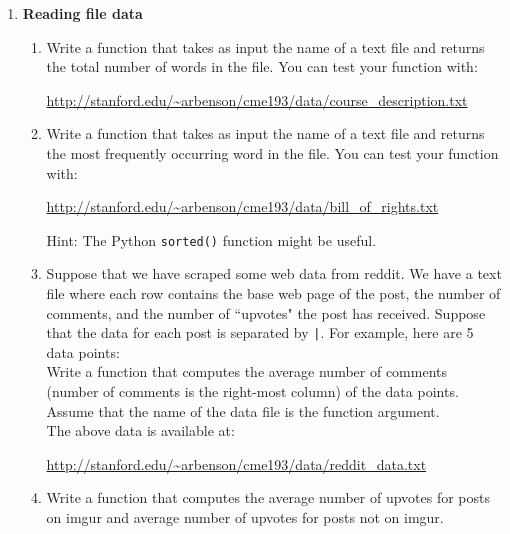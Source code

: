 \documentclass{article}
\newcounter{points}
\begin{document}
\pagestyle{fancy}
\begin{enumerate}

\item \textbf{Reading file data}
\begin{enumerate}
\item Write a function that takes as input the name of a text file and returns the total number of words in the file.  You can test your function with:
\begin{center}
\url{http://stanford.edu/~arbenson/cme193/data/course_description.txt}
\end{center}
\end{enumerate}

\begin{enumerate}
\setcounter{enumii}{1}
\item Write a function that takes as input the name of a text file and returns the most frequently occurring word in the file.  You can test your function with:
\begin{center}
\url{http://stanford.edu/~arbenson/cme193/data/bill_of_rights.txt}
\end{center}
Hint: The Python \texttt{sorted()} function might be useful. \\
\end{enumerate}

\begin{enumerate}
\setcounter{enumii}{2}
\item Suppose that we have scraped some web data from reddit.  We have a text file where each row contains the base web page of the post, the number of comments, and the number of ``upvotes" the post has received.  Suppose that the data for each post is separated by \texttt{|}.  For example, here are 5 data points: \\

Write a function that computes the average number of comments (number of comments is the right-most column) of the data points.  Assume that the name of the data file is the function argument. \\

The above data is available at:
\begin{center}
\url{http://stanford.edu/~arbenson/cme193/data/reddit_data.txt}
\end{center}

\end{enumerate}

\begin{enumerate}
\setcounter{enumii}{3}
\item Write a function that computes the average number of upvotes for posts on imgur and average number of upvotes for posts not on imgur.
\end{enumerate}


\end{enumerate}
\end{document}
